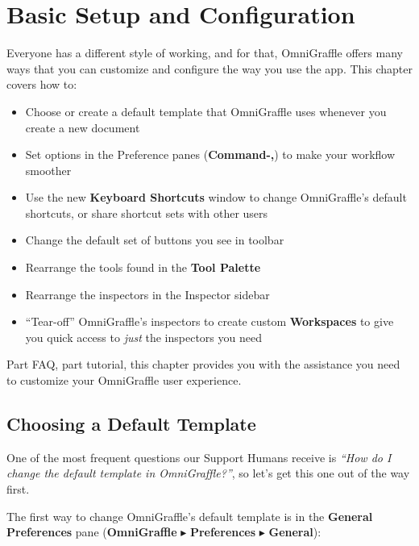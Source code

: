 \documentclass[../main.tex]{subfiles}
\begin{document}
\chapter{Basic Setup and Configuration}

Everyone has a different style of working, and for that, OmniGraffle offers many ways that you
can customize and configure the way you use the app. This chapter covers how to:

\begin{itemize}
  \item Choose or create a default template that OmniGraffle uses whenever you create a new
    document
  \item Set options in the Preference panes (\textbf{Command-,}) to make your workflow smoother
  \item Use the new \textbf{Keyboard Shortcuts} window to change OmniGraffle's default
    shortcuts, or share shortcut sets with other users
  \item Change the default set of buttons you see in toolbar
  \item Rearrange the tools found in the \textbf{Tool Palette}
  \item Rearrange the inspectors in the Inspector sidebar
  \item ``Tear-off'' OmniGraffle's inspectors to create custom \textbf{Workspaces} to give you
    quick access to \textit{just} the inspectors you need
\end{itemize}

Part FAQ, part tutorial, this chapter provides you with the assistance you need to customize
your OmniGraffle user experience.

\section{Choosing a Default Template}

One of the most frequent questions our Support Humans receive is \textit{``How do I change the
default template in OmniGraffle?''}, so let's get this one out of the way first.

The first way to change OmniGraffle's default template is in the \textbf{General Preferences}
pane (\textbf{OmniGraffle} $\blacktriangleright$ \textbf{Preferences} $\blacktriangleright$
\textbf{General}):

\end{document}
